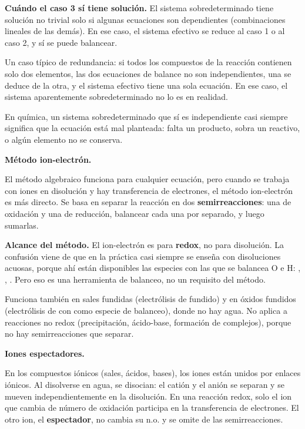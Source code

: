 \begin{notaimportante}
\textbf{Cuándo el caso 3 sí tiene solución.} El sistema
sobredeterminado tiene solución no trivial solo si algunas
ecuaciones son dependientes (combinaciones lineales de las
demás). En ese caso, el sistema efectivo se reduce al caso 1 o
al caso 2, y sí se puede balancear.

Un caso típico de redundancia: si todos los compuestos de la
reacción contienen solo dos elementos, las dos ecuaciones de
balance no son independientes, una se deduce de la otra, y el
sistema efectivo tiene una sola ecuación. En ese caso, el
sistema aparentemente sobredeterminado no lo es en realidad.

En química, un sistema sobredeterminado que sí es independiente
casi siempre significa que la ecuación está mal planteada: falta
un producto, sobra un reactivo, o algún elemento no se conserva.
\end{notaimportante}

\medskip
\textbf{Método ion-electrón.}

El método algebraico funciona para cualquier ecuación, pero
cuando se trabaja con iones en disolución y hay transferencia de
electrones, el método ion-electrón es más directo. Se basa en
separar la reacción en dos \textbf{semirreacciones}: una de
oxidación y una de reducción, balancear cada una por separado, y
luego sumarlas.

\begin{notafija}
\textbf{Alcance del método.} El ion-electrón es para
\textbf{redox}, no para disolución. La confusión viene de que en
la práctica casi siempre se enseña con disoluciones acuosas,
porque ahí están disponibles las especies con las que se balancea
O e H: , , . Pero eso es una herramienta
de balanceo, no un requisito del método.

Funciona también en sales fundidas (electrólisis de 
fundido) y en óxidos fundidos (electrólisis de  con
 como especie de balanceo), donde no hay agua. No
aplica a reacciones no redox (precipitación, ácido-base,
formación de complejos), porque no hay semirreacciones que
separar.
\end{notafija}

\medskip
\textbf{Iones espectadores.}

En los compuestos iónicos (sales, ácidos, bases), los iones están
unidos por enlaces iónicos. Al disolverse en agua, se disocian:
el catión y el anión se separan y se mueven independientemente en
la disolución. En una reacción redox, solo el ion que cambia de
número de oxidación participa en la transferencia de electrones.
El otro ion, el \textbf{espectador}, no cambia su n.o. y se omite
de las semirreacciones.

